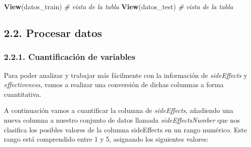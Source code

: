\documentclass[spanish,]{article}
\newenvironment{Shaded}{\begin{snugshade}}{\end{snugshade}}
\newcommand{\CommentTok}[1]{\textcolor[rgb]{0.56,0.35,0.01}{\textit{#1}}}
\newcommand{\KeywordTok}[1]{\textcolor[rgb]{0.13,0.29,0.53}{\textbf{#1}}}
\newcommand{\NormalTok}[1]{#1}
\begin{document}
\begin{Shaded}
\begin{Highlighting}[]
\KeywordTok{View}\NormalTok{(datos_train)    }\CommentTok{# vista de la tabla}
\KeywordTok{View}\NormalTok{(datos_test)    }\CommentTok{# vista de la tabla}
\end{Highlighting}
\end{Shaded}

\hypertarget{procesar-datos}{%
\subsection{2.2. Procesar datos}\label{procesar-datos}}

\hypertarget{cuantificacion-de-variables}{%
\subsubsection{2.2.1. Cuantificación de
variables}\label{cuantificacion-de-variables}}

Para poder analizar y trabajar más fácilmente con la información de
\emph{sideEffects} y \emph{effectiveness}, vamos a realizar una
conversión de dichas columnas a forma cuantitativa.

A continuación vamos a cuantificar la columna de \emph{sideEffects},
añadiendo una nueva columna a nuestro conjunto de datos llamada
\emph{sideEffectsNumber} que nos clasifica los posibles valores de la
columna sideEffects en un rango numérico. Este rango está comprendido
entre 1 y 5, asignando los siguientes valores:
\end{document}
